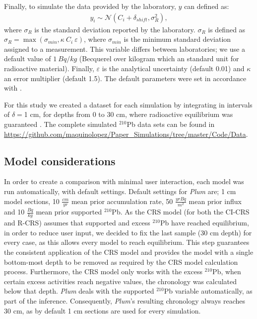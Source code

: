 \documentclass [10pt] {article}
\begin{document}
Finally, to simulate the data provided by the laboratory, $y$ can defined as:   
\begin{align}
	y_i\sim\mathcal{N}\left(C_{i} + \delta_{shift}, \sigma^2_{R} \right), 
\end{align}
where $\sigma_R$ is the standard deviation reported by the laboratory. 
$\sigma_R$ is defined as $\sigma_R= \max \left(\sigma_{min}, \kappa~C_i ~\varepsilon \right)$, where $\sigma_{min}$ is the minimum standard deviation assigned to a measurement. This variable differs between laboratories; we use a default value of $1~ Bq/kg$ (Becquerel over kilogram which an standard unit for radioactive material). 
Finally, $\varepsilon$ is the analytical uncertainty (default 0.01) and $\kappa$ an error multiplier (default 1.5).
The default parameters were set in accordance with \citet{Blaauw2018}.


For this study we created a dataset for each simulation by integrating in intervals of $\delta =$1 cm, for depths from  0 to 30 cm, where radioactive equilibrium was guaranteed \citep{Aquino2018}.
The complete simulated $^{210}$Pb data sets can be found in \url{https://github.com/maquinolopez/Paper\_Simulations/tree/master/Code/Data}.

\subsection{Model considerations}
In order to create a comparison with minimal user interaction, each model was run automatically, with default settings.
Default settings for \textit{Plum} are; 1 cm model sections, 10 $\frac{cm}{yr}$ mean prior accumulation rate, 50 $\frac{yr Bq}{m^2}$ mean prior influx and 10 $\frac{Bq}{kg}$ mean prior supported $^{210}$Pb.
As the CRS model (for both the CI-CRS and R-CRS) assumes that supported and excess $^{210}$Pb have reached equilibrium, in order to reduce user input, we decided to fix the last sample (30 cm depth) for every case, as this allows every model to reach equilibrium. This step guarantees the consistent application of the CRS model and provides the model with a single bottom-most depth to be removed as required by the CRS model calculation process. 
Furthermore, the CRS model only works with the excess $^{210}$Pb, when certain excess activities reach negative values, the chronology was calculated below that depth.
\textit{Plum} deals with the supported $^{210}$Pb variable automatically, as part of the inference.
Consequently, \textit{Plum}'s resulting chronology always reaches 30 cm, as by default 1 cm sections are used for every simulation.
\end{document}
